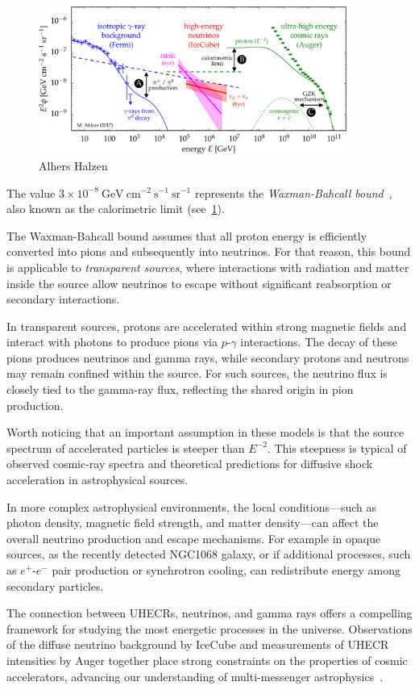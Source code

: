\begin{figure}[!t]
\centering
\includegraphics[width=0.90\textwidth]{figures/panorama.pdf}
\caption{Alhers Halzen~\cite{Ahlers2018ppnp}}
\label{fig:uhemm}
\end{figure}

The value \(3 \times 10^{-8}~\text{GeV}~\text{cm}^{-2}~\text{s}^{-1}~\text{sr}^{-1}\) represents the \emph{Waxman-Bahcall bound}~\cite{aaa}, also known as the calorimetric limit (see~\cref{fig:uhemm}).  

The Waxman-Bahcall bound assumes that all proton energy is efficiently converted into pions and subsequently into neutrinos. For that reason, this bound is applicable to \emph{transparent sources}, where interactions with radiation and matter inside the source allow neutrinos to escape without significant reabsorption or secondary interactions.

In transparent sources, protons are accelerated within strong magnetic fields and interact with photons to produce pions via \(p\)-\(\gamma\) interactions. The decay of these pions produces neutrinos and gamma rays, while secondary protons and neutrons may remain confined within the source. 
%
For such sources, the neutrino flux is closely tied to the gamma-ray flux, reflecting the shared origin in pion production.

Worth noticing that an important assumption in these models is that the source spectrum of accelerated particles is steeper than \(E^{-2}\). This steepness is typical of observed cosmic-ray spectra and theoretical predictions for diffusive shock acceleration in astrophysical sources. 

In more complex astrophysical environments, the local conditions—such as photon density, magnetic field strength, and matter density—can affect the overall neutrino production and escape mechanisms. For example in opaque sources, as the recently detected NGC1068 galaxy, or if additional processes, such as \(e^+\)-\(e^-\) pair production or synchrotron cooling, can redistribute energy among secondary particles.

The connection between UHECRs, neutrinos, and gamma rays offers a compelling framework for studying the most energetic processes in the universe. Observations of the diffuse neutrino background by IceCube and measurements of UHECR intensities by Auger together place strong constraints on the properties of cosmic accelerators, advancing our understanding of multi-messenger astrophysics~\cite{}.

